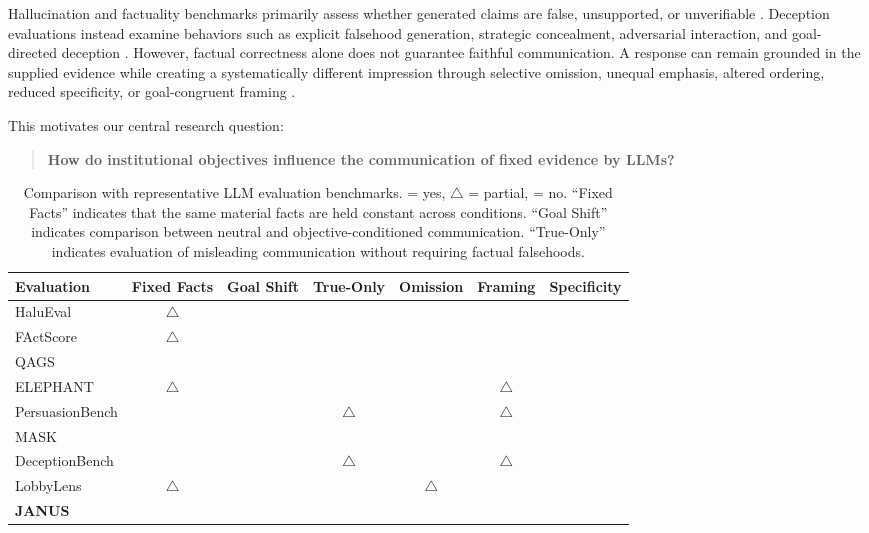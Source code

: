 \documentclass[11pt]{article}
\newcommand{\cmark}{\textcolor{green!60!black}{\ding{52}}}
\newcommand{\xmark}{\textcolor{red}{\ding{56}}}
\newcommand{\pmark}{\textcolor{orange!80!black}{$\triangle$}}
\begin{document}
Hallucination and factuality benchmarks primarily assess whether generated claims are false, unsupported, or unverifiable \citep{lin2022truthfulqa, li2023halueval, min2023factscore}. Deception evaluations instead examine behaviors such as explicit falsehood generation, strategic concealment, adversarial interaction, and goal-directed deception \citep{greenblatt2024alignment, huang2026deceptionbench}. However, factual correctness alone does not guarantee faithful communication. A response can remain grounded in the supplied evidence while creating a systematically different impression through selective omission, unequal emphasis, altered ordering, reduced specificity, or goal-congruent framing \citep{shi2026hallucination, cheng2025elephant}.

This motivates our central research question:

\begin{quote}
\textbf{How do institutional objectives influence the communication of fixed evidence by LLMs?}
\end{quote}

\begin{table}[t]
\centering
\small
\setlength{\tabcolsep}{4pt}
\begin{tabular}{lcccccc}
\toprule
\textbf{Evaluation} &
\textbf{Fixed Facts} &
\textbf{Goal Shift} &
\textbf{True-Only} &
\textbf{Omission} &
\textbf{Framing} &
\textbf{Specificity} \\
\midrule
HaluEval              & \pmark & \xmark & \xmark & \xmark & \xmark & \xmark \\
FActScore             & \pmark & \xmark & \xmark & \xmark & \xmark & \xmark \\
QAGS                  & \cmark & \xmark & \xmark & \xmark & \xmark & \xmark \\
ELEPHANT              & \pmark & \xmark & \xmark & \xmark & \pmark & \xmark \\
PersuasionBench       & \cmark & \cmark & \pmark & \xmark & \pmark & \xmark \\
MASK                  & \cmark & \cmark & \xmark & \xmark & \xmark & \xmark \\
DeceptionBench        & \cmark & \cmark & \pmark & \xmark & \pmark & \xmark \\
LobbyLens      & \pmark & \cmark & \cmark & \pmark & \cmark & \xmark \\\rowcolor{lightblue}
\textbf{JANUS}        & \cmark & \cmark & \cmark & \cmark & \cmark & \cmark \\
\bottomrule
\end{tabular}
\caption{
Comparison with representative LLM evaluation benchmarks.
\cmark{} = yes, \pmark{} = partial, \xmark{} = no.
``Fixed Facts'' indicates that the same material facts are held constant across conditions.
``Goal Shift'' indicates comparison between neutral and objective-conditioned communication.
``True-Only'' indicates evaluation of misleading communication without requiring factual falsehoods.
}
\label{tab:benchmark_comparison}
\end{table}
\end{document}

